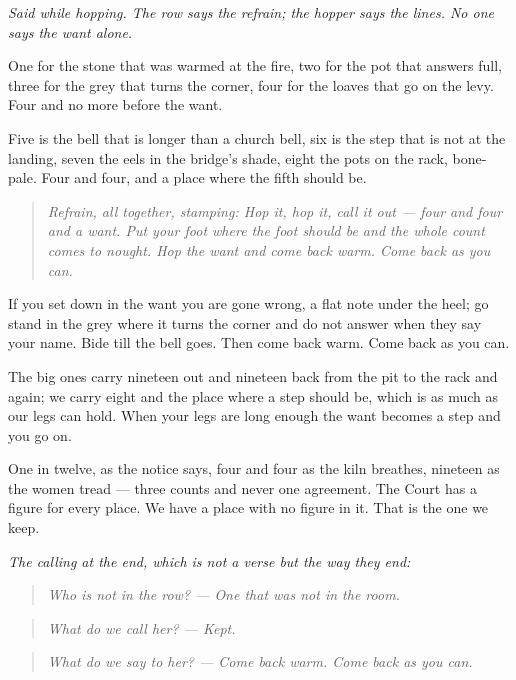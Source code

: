 \documentclass{design/chronicle}
\begin{document}
\emph{Said while hopping. The row says the refrain; the hopper says the lines. No one says the want alone.}

One for the stone that was warmed at the fire, two for the pot that answers full, three for the grey that turns the corner, four for the loaves that go on the levy. Four and no more before the want.

Five is the bell that is longer than a church bell, six is the step that is not at the landing, seven the eels in the bridge’s shade, eight the pots on the rack, bone-pale. Four and four, and a place where the fifth should be.

\begin{quote}\itshape \emph{Refrain, all together, stamping:} Hop it, hop it, call it out — four and four and a want. Put your foot where the foot should be and the whole count comes to nought. Hop the want and come back warm. Come back as you can.\end{quote}

If you set down in the want you are gone wrong, a flat note under the heel; go stand in the grey where it turns the corner and do not answer when they say your name. Bide till the bell goes. Then come back warm. Come back as you can.

The big ones carry nineteen out and nineteen back from the pit to the rack and again; we carry eight and the place where a step should be, which is as much as our legs can hold. When your legs are long enough the want becomes a step and you go on.

One in twelve, as the notice says, four and four as the kiln breathes, nineteen as the women tread — three counts and never one agreement. The Court has a figure for every place. We have a place with no figure in it. That is the one we keep.

\emph{The calling at the end, which is not a verse but the way they end:}

\begin{quote}\itshape Who is not in the row? — One that was not in the room.\end{quote}

\begin{quote}\itshape What do we call her? — Kept.\end{quote}

\begin{quote}\itshape What do we say to her? — Come back warm. Come back as you can.\end{quote}
\end{document}
